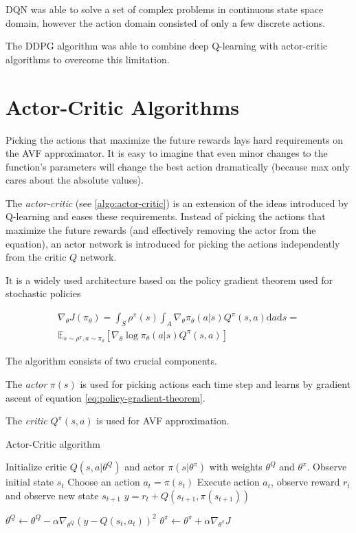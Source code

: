 DQN was able to solve a set of complex problems in continuous state space domain, however the action domain consisted of only a few discrete actions. 

The DDPG algorithm was able to combine deep Q-learning with actor-critic algorithms to overcome this limitation.

\section{Actor-Critic Algorithms}
Picking the actions that maximize the future rewards lays hard requirements on the AVF approximator. It is easy to imagine that even minor changes to the function's parameters will change the best action dramatically (because max only cares about the absolute values).

The \textit{actor-critic} (see \ref{algo:actor-critic}) is an extension of the ideas introduced by Q-learning and eases these requirements. Instead of picking the actions that maximize the future rewards (and effectively removing the actor from the equation), an actor network is introduced for picking the actions independently from the critic $Q$ network.

It is a widely used architecture based on the policy gradient theorem used for stochastic policies

\begin{equation}
\begin{split}
\nabla_\theta J(\pi_\theta)=\int_S \rho^\pi(s) \int_A \nabla_\theta \pi_\theta(a|s)Q^\pi(s,a)\text{d}a\text{d} s=\\
\mathbb{E}_{s\sim\rho^\pi, a\sim\pi_\theta}[\nabla_\theta \log \pi_\theta(a|s)Q^\pi(s,a)]
\end{split}
\label{eq:policy-gradient-theorem}
\end{equation}

The algorithm consists of two crucial components. 

The \textit{actor} $\pi(s)$ is used for picking actions each time step and learns by gradient ascent of equation \ref{eq:policy-gradient-theorem}.

The \textit{critic} $Q^\pi(s,a)$ is used for AVF approximation.

\begin{algorithm}[h]
  \caption{Actor-Critic algorithm \label{algo:actor-critic}}
  \label{algo:actor-critic}
  \begin{algorithmic}
    \STATE Initialize critic $Q(s, a | \theta^Q)$ and actor
    $\pi(s | \theta^{\pi})$ with weights $\theta^{Q}$ and $\theta^{\pi}$.
    \STATE Observe initial state $s_t$
      \STATE Choose an action $a_t = \pi(s_t)$
      \STATE Execute action $a_t$, observe reward $r_t$ and observe new state $s_{t+1}$
      \STATE $y=r_t+Q(s_{t+1},\pi(s_{t+1}))$
      
      \STATE $\theta^Q \leftarrow \theta^Q-\alpha\nabla_{\theta^Q}\left(y-Q(s_t, a_t)\right)^2$
      \STATE $\theta^\pi \leftarrow \theta^\pi+\alpha\nabla_{\theta^\pi}J$
    \ENDFOR
  \end{algorithmic}
\end{algorithm}


